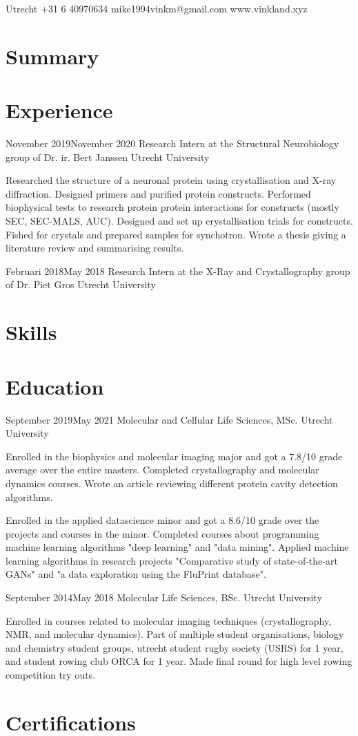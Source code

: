 \documentclass{cv}
\begin{document}
{Utrecht}
{+31 6 40970634}
{mike1994vinkm@gmail.com}
{www.vinkland.xyz}

\section{Summary}
\section{Experience}

\experience
{November 2019}{November 2020}
{Research Intern at the Structural Neurobiology group of Dr. ir. Bert Janssen}
{Utrecht University}{
\item Researched the structure of a neuronal protein using crystallisation and X-ray diffraction. Designed primers and purified protein constructs. Performed biophysical tests to research protein protein interactions for constructs (mostly SEC, SEC-MALS, AUC). Designed and set up crystallisation trials for constructs. Fished for crystals and prepared samples for synchotron. Wrote a thesis giving a literature review and summarising results.
}

\experience
{Februari 2018}{May 2018}
{Research Intern at the X-Ray and Crystallography group of Dr. Piet Gros}
{Utrecht University}{
\item
}

\section{Skills}
\section{Education}

\experience
{September 2019}{May 2021}
{Molecular and Cellular Life Sciences, MSc.}
{Utrecht University}{
\item Enrolled in the biophysics and molecular imaging major and got a 7.8/10 grade average over the entire masters. Completed crystallography and molecular dynamics courses. Wrote an article reviewing different protein cavity detection algorithms.
\item Enrolled in the applied datascience minor and got a 8.6/10 grade over the projects and courses in the minor. Completed courses about programming machine learning algorithms "deep learning" and "data mining". Applied machine learning algorithms in research projects "Comparative study of state-of-the-art GANs" and "a data exploration using the FluPrint database".
}

\experience
{September 2014}{May 2018}
{Molecular Life Sciences, BSc.}
{Utrecht University}{
\item Enrolled in courses related to molecular imaging techniques (crystallography, NMR, and molecular dynamics). Part of multiple student organisations, biology and chemistry student groups, utrecht student rugby society (USRS) for 1 year, and student rowing club ORCA for 1 year. Made final round for high level rowing competition try outs.
}

\section{Certifications}
\end{document}
